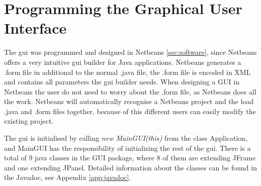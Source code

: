 \section{Programming the Graphical User Interface}
The \acrshort{gui} was programmed and designed in Netbeans \ref{sec:software}, since Netbeans offers a very intuitive \acrshort{gui} builder for Java applications. Netbeans generates a .form file in additional to the normal .java file, the .form file is encoded in XML and contains all parameters the \acrshort{gui} builder needs. When designing a GUI in Netbeans the user do not need to worry about the .form file, as Netbeans does all the work. Netbeans will automatically recognise a Netbeans project and the load .java and .form files together, because of this different users can easily modify the existing project.

The \acrshort{gui} is initialised by calling \textit{new MainGUI(this)} from the class Application, and MainGUI has the responsibility of initializing the rest of the \acrshort{gui}. There is a total of 9 java classes in the GUI package, where 8 of them are extending JFrame and one extending JPanel. Detailed information about the classes can be found in the Javadoc, see Appendix \ref{app:javadoc}.
